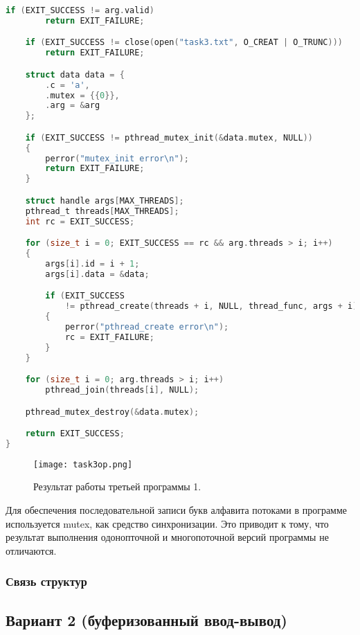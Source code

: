 \begin{lstlisting}[language=c, caption={Третья программа 1 (многопоточный вариант)}]
    if (EXIT_SUCCESS != arg.valid)
        return EXIT_FAILURE;

    if (EXIT_SUCCESS != close(open("task3.txt", O_CREAT | O_TRUNC)))
        return EXIT_FAILURE;

    struct data data = {
        .c = 'a',
        .mutex = {{0}},
        .arg = &arg
    };

    if (EXIT_SUCCESS != pthread_mutex_init(&data.mutex, NULL))
    {
        perror("mutex_init error\n");
        return EXIT_FAILURE;
    }

    struct handle args[MAX_THREADS];
    pthread_t threads[MAX_THREADS];
    int rc = EXIT_SUCCESS;

    for (size_t i = 0; EXIT_SUCCESS == rc && arg.threads > i; i++)
    {
        args[i].id = i + 1;
        args[i].data = &data;

        if (EXIT_SUCCESS
            != pthread_create(threads + i, NULL, thread_func, args + i))
        {
            perror("pthread_create error\n");
            rc = EXIT_FAILURE;
        }
    }

    for (size_t i = 0; arg.threads > i; i++)
        pthread_join(threads[i], NULL);

    pthread_mutex_destroy(&data.mutex);

    return EXIT_SUCCESS;
}
\end{lstlisting}

\begin{figure}[h]
    \centering
    \texttt{[image: task3op.png]}
    \caption{Результат работы третьей программы 1.}
\end{figure}

Для обеспечения последовательной записи букв алфавита потоками в программе
используется mutex, как средство синхронизации. Это приводит к тому, что
результат выполнения одонопточной и многопоточной версий программы не
отличаются.

\subsubsection{Связь структур}

\vspace*{\fill}
\begin{figure}[h]
    \centering
    \def\svgwidth{\textwidth}
    
\end{figure}
\vfill

\subsection{Вариант 2 (буферизованный ввод-вывод)}
